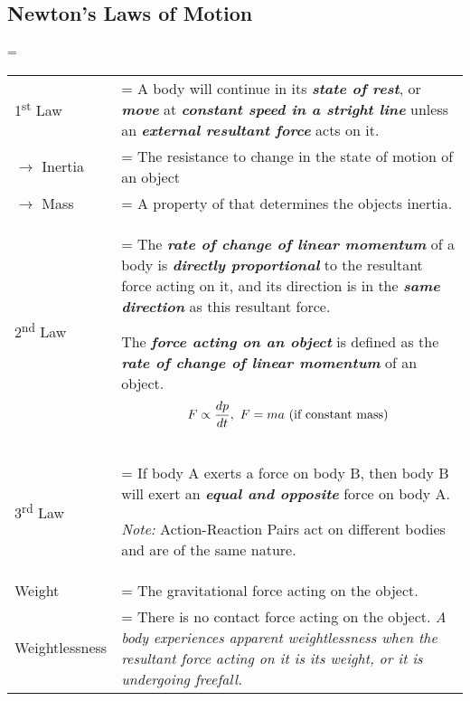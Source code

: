 \documentclass[a4paper]{article}
\newlength{\oldparskip}
\begin{document}
		\subsection{Newton's Laws of Motion}
			\oldparskip=\parskip
			\begin{center}
				\renewcommand{\arraystretch}{1.2}
				\begin{tabular}{@{} l >{\parskip=\oldparskip}p{10.5cm} @{}}
					\toprule
					1\textsuperscript{st} Law & A body will continue in its \textit{\textbf{state of rest}}, or \textbf{\textit{move}} at \textbf{\textit{constant speed in a stright line}} unless an \textbf{\textit{external resultant force}} acts on it.\\
					$\rightarrow$ Inertia & The resistance to change in the state of motion of an object \\
					$\rightarrow$ Mass & A property of that determines the objects inertia. \\
					\midrule
					2\textsuperscript{nd} Law & The \textbf{\textit{rate of change of linear momentum}} of a body is \textbf{\textit{directly proportional}} to the resultant force acting on it, and its direction is in the \textbf{\textit{same direction}} as this resultant force. \par The \textbf{\textit{force acting on an object}} is defined as the \textbf{\textit{rate of change of linear momentum}} of an object. $$F \propto \frac{dp}{dt}, ~F=ma \textrm{ (if constant mass)} \vspace*{-\baselineskip}$$ \\
					\midrule
					3\textsuperscript{rd} Law & If body A exerts a force on body B, then body B will exert an \textbf{\textit{equal and opposite}} force on body A. \par \textit{Note:} Action-Reaction Pairs act on different bodies and are of the same nature.\\
					\midrule
					Weight & The gravitational force acting on the object. \\
					Weightlessness & There is no contact force acting on the object. \textit{A body experiences apparent weightlessness when the resultant force acting on it is its weight, or it is undergoing freefall.} \\
					\bottomrule
				\end{tabular}
			\end{center}
\end{document}
